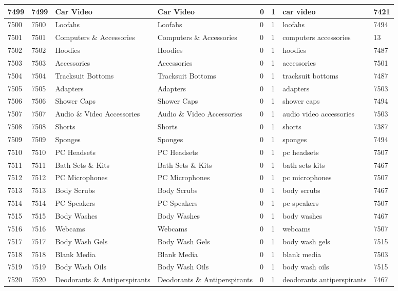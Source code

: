 \begin{longtable}{|l|l|l|l|l|l|l|l|}
7499 & 7499 & Car Video & Car Video & 0 & 1 & car video & 7421 \\ \hline 
7500 & 7500 & Loofahs & Loofahs & 0 & 1 & loofahs & 7494 \\ \hline 
7501 & 7501 & Computers \& Accessories & Computers \& Accessories & 0 & 1 & computers accessories & 13 \\ \hline 
7502 & 7502 & Hoodies & Hoodies & 0 & 1 & hoodies & 7487 \\ \hline 
7503 & 7503 & Accessories & Accessories & 0 & 1 & accessories & 7501 \\ \hline 
7504 & 7504 & Tracksuit Bottoms & Tracksuit Bottoms & 0 & 1 & tracksuit bottoms & 7487 \\ \hline 
7505 & 7505 & Adapters & Adapters & 0 & 1 & adapters & 7503 \\ \hline 
7506 & 7506 & Shower Caps & Shower Caps & 0 & 1 & shower caps & 7494 \\ \hline 
7507 & 7507 & Audio \& Video Accessories & Audio \& Video Accessories & 0 & 1 & audio video accessories & 7503 \\ \hline 
7508 & 7508 & Shorts & Shorts & 0 & 1 & shorts & 7387 \\ \hline 
7509 & 7509 & Sponges & Sponges & 0 & 1 & sponges & 7494 \\ \hline 
7510 & 7510 & PC Headsets & PC Headsets & 0 & 1 & pc headsets & 7507 \\ \hline 
7511 & 7511 & Bath Sets \& Kits & Bath Sets \& Kits & 0 & 1 & bath sets kits & 7467 \\ \hline 
7512 & 7512 & PC Microphones & PC Microphones & 0 & 1 & pc microphones & 7507 \\ \hline 
7513 & 7513 & Body Scrubs & Body Scrubs & 0 & 1 & body scrubs & 7467 \\ \hline 
7514 & 7514 & PC Speakers & PC Speakers & 0 & 1 & pc speakers & 7507 \\ \hline 
7515 & 7515 & Body Washes & Body Washes & 0 & 1 & body washes & 7467 \\ \hline 
7516 & 7516 & Webcams & Webcams & 0 & 1 & webcams & 7507 \\ \hline 
7517 & 7517 & Body Wash Gels & Body Wash Gels & 0 & 1 & body wash gels & 7515 \\ \hline 
7518 & 7518 & Blank Media & Blank Media & 0 & 1 & blank media & 7503 \\ \hline 
7519 & 7519 & Body Wash Oils & Body Wash Oils & 0 & 1 & body wash oils & 7515 \\ \hline 
7520 & 7520 & Deodorants \& Antiperspirants & Deodorants \& Antiperspirants & 0 & 1 & deodorants antiperspirants & 7467 \\ \hline 

\end{longtable}
